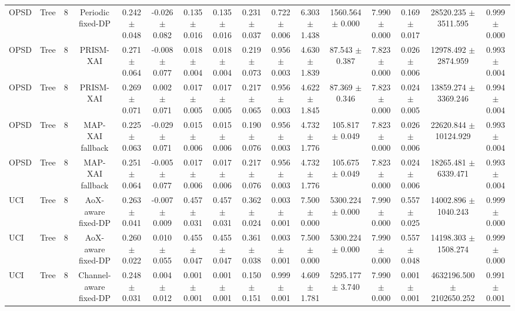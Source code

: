 \begin{tabular}{lccccccccccccccc}
OPSD & Tree & 8 & Periodic fixed-DP & 0.242 $\pm$ 0.048 & -0.026 $\pm$ 0.082 & 0.135 $\pm$ 0.016 & 0.135 $\pm$ 0.016 & 0.231 $\pm$ 0.037 & 0.722 $\pm$ 0.006 & 6.303 $\pm$ 1.438 & 1560.564 $\pm$ 0.000 & 7.990 $\pm$ 0.000 & 0.169 $\pm$ 0.017 & 28520.235 $\pm$ 3511.595 & 0.999 $\pm$ 0.000 \\
OPSD & Tree & 8 & PRISM-XAI & 0.271 $\pm$ 0.064 & -0.008 $\pm$ 0.077 & 0.018 $\pm$ 0.004 & 0.018 $\pm$ 0.004 & 0.219 $\pm$ 0.073 & 0.956 $\pm$ 0.003 & 4.630 $\pm$ 1.839 & 87.543 $\pm$ 0.387 & 7.823 $\pm$ 0.000 & 0.026 $\pm$ 0.006 & 12978.492 $\pm$ 2874.959 & 0.993 $\pm$ 0.004 \\
OPSD & Tree & 8 & PRISM-XAI & 0.269 $\pm$ 0.071 & 0.002 $\pm$ 0.071 & 0.017 $\pm$ 0.005 & 0.017 $\pm$ 0.005 & 0.217 $\pm$ 0.065 & 0.956 $\pm$ 0.003 & 4.622 $\pm$ 1.845 & 87.369 $\pm$ 0.346 & 7.823 $\pm$ 0.000 & 0.024 $\pm$ 0.005 & 13859.274 $\pm$ 3369.246 & 0.994 $\pm$ 0.004 \\
OPSD & Tree & 8 & MAP-XAI fallback & 0.225 $\pm$ 0.063 & -0.029 $\pm$ 0.071 & 0.015 $\pm$ 0.006 & 0.015 $\pm$ 0.006 & 0.190 $\pm$ 0.076 & 0.956 $\pm$ 0.003 & 4.732 $\pm$ 1.776 & 105.817 $\pm$ 0.049 & 7.823 $\pm$ 0.000 & 0.026 $\pm$ 0.006 & 22620.844 $\pm$ 10124.929 & 0.993 $\pm$ 0.004 \\
OPSD & Tree & 8 & MAP-XAI fallback & 0.251 $\pm$ 0.064 & -0.005 $\pm$ 0.077 & 0.017 $\pm$ 0.006 & 0.017 $\pm$ 0.006 & 0.217 $\pm$ 0.076 & 0.956 $\pm$ 0.003 & 4.732 $\pm$ 1.776 & 105.675 $\pm$ 0.049 & 7.823 $\pm$ 0.000 & 0.024 $\pm$ 0.006 & 18265.481 $\pm$ 6339.471 & 0.993 $\pm$ 0.004 \\
UCI & Tree & 8 & AoX-aware fixed-DP & 0.263 $\pm$ 0.041 & -0.007 $\pm$ 0.009 & 0.457 $\pm$ 0.031 & 0.457 $\pm$ 0.031 & 0.362 $\pm$ 0.024 & 0.003 $\pm$ 0.001 & 7.500 $\pm$ 0.000 & 5300.224 $\pm$ 0.000 & 7.990 $\pm$ 0.000 & 0.557 $\pm$ 0.025 & 14002.896 $\pm$ 1040.243 & 0.999 $\pm$ 0.000 \\
UCI & Tree & 8 & AoX-aware fixed-DP & 0.260 $\pm$ 0.022 & 0.010 $\pm$ 0.055 & 0.455 $\pm$ 0.047 & 0.455 $\pm$ 0.047 & 0.361 $\pm$ 0.038 & 0.003 $\pm$ 0.001 & 7.500 $\pm$ 0.000 & 5300.224 $\pm$ 0.000 & 7.990 $\pm$ 0.000 & 0.557 $\pm$ 0.048 & 14198.303 $\pm$ 1508.274 & 0.999 $\pm$ 0.000 \\
UCI & Tree & 8 & Channel-aware fixed-DP & 0.248 $\pm$ 0.031 & 0.004 $\pm$ 0.012 & 0.001 $\pm$ 0.001 & 0.001 $\pm$ 0.001 & 0.150 $\pm$ 0.151 & 0.999 $\pm$ 0.001 & 4.609 $\pm$ 1.781 & 5295.177 $\pm$ 3.740 & 7.990 $\pm$ 0.000 & 0.001 $\pm$ 0.001 & 4632196.500 $\pm$ 2102650.252 & 0.991 $\pm$ 0.001 \\

\end{tabular}

